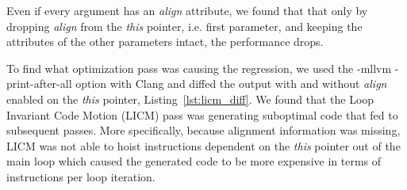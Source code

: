 Even if every argument has an \textit{align} attribute, we found that that only
by dropping \textit{align} from the \textit{this} pointer, i.e. first parameter, and
keeping the attributes of the other parameters intact, the performance drops.

To find what optimization pass was causing the regression, we used the -mllvm
-print-after-all option with Clang and diffed the output with and without
\textit{align} enabled on the \textit{this} pointer,
Listing~\ref{lst:licm_diff}. We found that the Loop Invariant Code Motion (LICM)
pass was generating suboptimal code that fed to subsequent passes. More
specifically, because alignment information was missing, LICM was not able to
hoist instructions dependent on the \textit{this} pointer out of the main loop
which caused the generated code to be more expensive in terms of instructions
per loop iteration.

